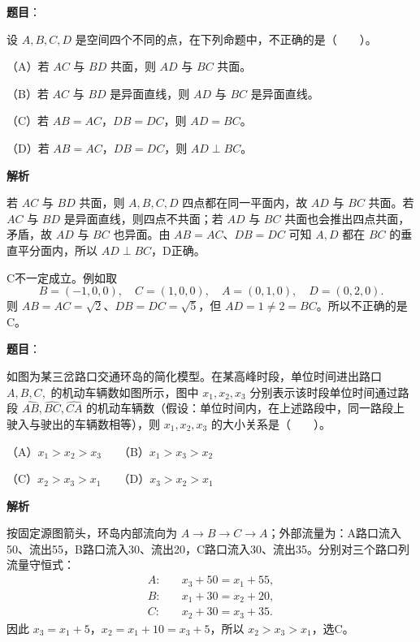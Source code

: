 \begin{answer}

\textbf{题目}：

设 $A,B,C,D$ 是空间四个不同的点，在下列命题中，不正确的是\mbox{（　　）}。

（A）若 $AC$ 与 $BD$ 共面，则 $AD$ 与 $BC$ 共面。

（B）若 $AC$ 与 $BD$ 是异面直线，则 $AD$ 与 $BC$ 是异面直线。

（C）若 $AB=AC$，$DB=DC$，则 $AD=BC$。

（D）若 $AB=AC$，$DB=DC$，则 $AD\perp BC$。

\textbf{解析}

若 $AC$ 与 $BD$ 共面，则 $A,B,C,D$ 四点都在同一平面内，故 $AD$ 与 $BC$ 共面。若 $AC$ 与 $BD$ 是异面直线，则四点不共面；若 $AD$ 与 $BC$ 共面也会推出四点共面，矛盾，故 $AD$ 与 $BC$ 也异面。由 $AB=AC$、$DB=DC$ 可知 $A,D$ 都在 $BC$ 的垂直平分面内，所以 $AD\perp BC$，D正确。

C不一定成立。例如取
\nopagebreak[4]
\[
B=(-1,0,0),\quad C=(1,0,0),\quad A=(0,1,0),\quad D=(0,2,0).
\]
则 $AB=AC=\sqrt2$、$DB=DC=\sqrt5$，但 $AD=1\ne2=BC$。所以不正确的是C。


\end{answer}
\begin{answer}

\textbf{题目}：

如图为某三岔路口交通环岛的简化模型。在某高峰时段，单位时间进出路口 $A,B,C,$ 的机动车辆数如图所示，图中 $x_1,x_2,x_3$ 分别表示该时段单位时间通过路段 $\widehat{AB},\widehat{BC},\widehat{CA}$ 的机动车辆数（假设：单位时间内，在上述路段中，同一路段上驶入与驶出的车辆数相等），则 $x_1,x_2,x_3$ 的大小关系是\mbox{（　　）}。

（A）$x_1>x_2>x_3$　　（B）$x_1>x_3>x_2$

（C）$x_2>x_3>x_1$　　（D）$x_3>x_2>x_1$
\nopagebreak[4]
\begin{center}\end{center}
\nopagebreak[4]
\textbf{解析}

按固定源图箭头，环岛内部流向为 $A\to B\to C\to A$；外部流量为：A路口流入50、流出55，B路口流入30、流出20，C路口流入30、流出35。分别对三个路口列流量守恒式：
\nopagebreak[4]
\[
\begin{aligned}
A:&\quad x_3+50=x_1+55,\\
B:&\quad x_1+30=x_2+20,\\
C:&\quad x_2+30=x_3+35.
\end{aligned}
\]
因此 $x_3=x_1+5$，$x_2=x_1+10=x_3+5$，所以 $x_2>x_3>x_1$，选C。


\end{answer}

